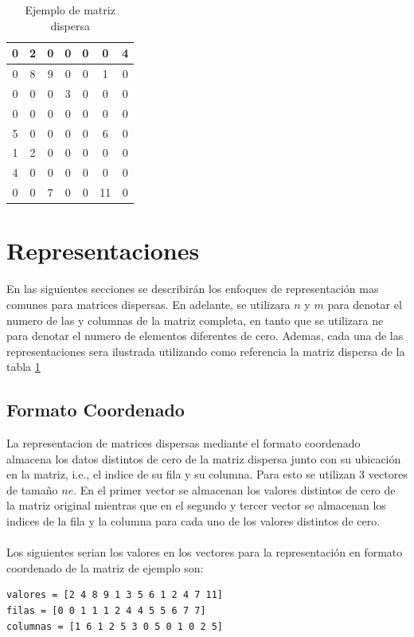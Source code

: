 \documentclass[onecolumn]{article}
\begin{document}
\begin{table}[H]
\centering
\begin{tabular}{|c|c|c|c|c|c|c|}
\hline
0& 2& 0& 0& 0& 0& 4 \\ \hline
0 &8 &9 &0 &0 &1 &0 \\ \hline
0 &0 &0 &3 &0 &0 &0 \\ \hline
0 &0 &0 &0 &0 &0 &0 \\ \hline
5 &0 &0 &0 &0 &6 &0 \\ \hline
1 &2 &0 &0 &0 &0 &0 \\ \hline
4 &0 &0 &0 &0 &0 &0 \\ \hline
0 &0 &7 &0 &0 &11 &0\\ \hline
\end{tabular}
\caption{Ejemplo de matriz dispersa}
\label{table:1}
\end{table}

\section{Representaciones}

En las siguientes secciones se describirán los enfoques de representación mas comunes para matrices dispersas.
En adelante, se utilizara $n$ y $m$ para denotar el numero de las y columnas de la matriz completa,
en tanto que se utilizara ne para denotar el numero de elementos diferentes de cero. Ademas, cada una
de las representaciones sera ilustrada utilizando como referencia la matriz dispersa de la tabla \ref{table:1}

\subsection{Formato Coordenado}

La representacion de matrices dispersas mediante el formato coordenado almacena los datos distintos de
cero de la matriz dispersa junto con su ubicación en la matriz, i.e., el indice de su fila y su columna. Para
esto se utilizan 3 vectores de tamaño $ne$. En el primer vector se almacenan los valores distintos de cero de la
matriz original mientras que en el segundo y tercer vector se almacenan los indices de la fila y la columna
para cada uno de los valores distintos de cero.
\\\\
Los siguientes serian los valores en los vectores para la representación en formato coordenado de la matriz de ejemplo son:

\begin{lstlisting}
valores = [2 4 8 9 1 3 5 6 1 2 4 7 11]
filas = [0 0 1 1 1 2 4 4 5 5 6 7 7]
columnas = [1 6 1 2 5 3 0 5 0 1 0 2 5]
\end{lstlisting}
\end{document}
